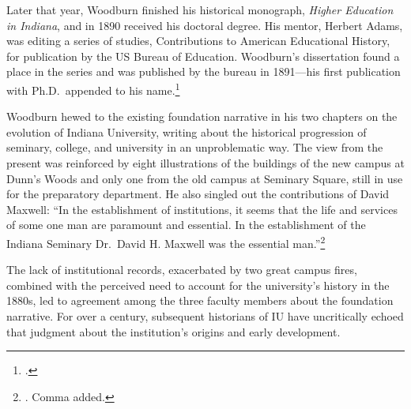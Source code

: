 \documentclass[
  american,
  letterpaper,
]{scrreprt}
\begin{document}
Later that year, Woodburn finished his historical monograph,
\emph{Higher Education in Indiana}, and in 1890 received his doctoral
degree. His mentor, Herbert Adams, was editing a series of studies,
Contributions to American Educational History, for publication by the US
Bureau of Education. Woodburn's dissertation found a place in the series
and was published by the bureau in 1891---his first publication with
Ph.D.~appended to his name.\footnote{.}

Woodburn hewed to the existing foundation narrative in his two chapters
on the evolution of Indiana University, writing about the historical
progression of seminary, college, and university in an unproblematic
way. The view from the present was reinforced by eight illustrations of
the buildings of the new campus at Dunn's Woods and only one from the
old campus at Seminary Square, still in use for the preparatory
department. He also singled out the contributions of David Maxwell: ``In
the establishment of institutions, it seems that the life and services
of some one man are paramount and essential. In the establishment of the
Indiana Seminary Dr.~David H. Maxwell was the essential
man.''\footnote{. Comma added.}

The lack of institutional records, exacerbated by two great campus
fires, combined with the perceived need to account for the university's
history in the 1880s, led to agreement among the three faculty members
about the foundation narrative. For over a century, subsequent
historians of IU have uncritically echoed that judgment about the
institution's origins and early development.
\end{document}
